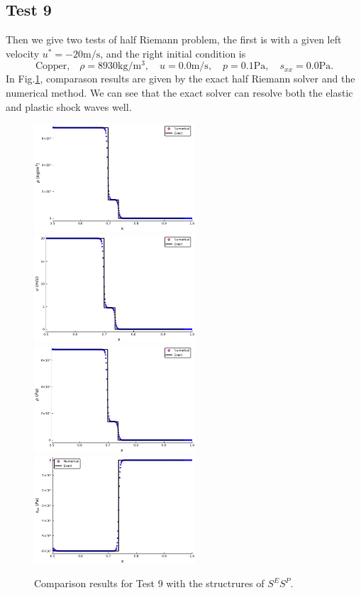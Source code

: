 \documentclass[review]{elsarticle}
\begin{document}
\subsection{Test 9}
Then we give two tests of  half Riemann problem, the first is with a given left velocity $u^* = -20\text{m/s}$, and the right initial condition is
\begin{equation}
 \text{Copper,}\quad\rho = 8930\text{kg}/\text{m}^3, \quad  u = 0.0\text{m}/\text{s}, \quad  p =0.1\text{Pa}, \quad  s_{xx}=0.0\text{Pa}.
\end{equation}
In Fig.\ref{fig:case9}, comparason results are given by the exact half Riemann solver and the numerical method. We can see that the exact solver  can resolve both the elastic and plastic shock waves well.
\begin{figure}
  \centering
  \includegraphics[width= 6cm] {case10rho.pdf}
  \includegraphics[width= 6cm] {case10u.pdf}
  \includegraphics[width= 6cm] {case10p.pdf}
  \includegraphics[width= 6cm] {case10sxx.pdf}

    \caption{Comparison results for Test 9 with the structrures of $S^ES^P$.  }
  \label{fig:case9}
\end{figure}
\end{document}
